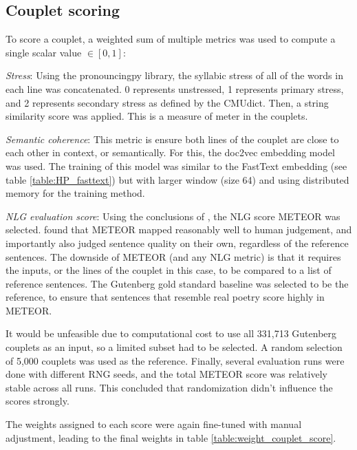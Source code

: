 \documentclass[11pt,a4paper]{article}
\newenvironment{tight_itemize}{
\begin{itemize}
\setlength{\itemsep}{0pt}
\setlength{\parskip}{0pt}
}{\end{itemize}}
\begin{document}
\subsection{Couplet scoring}
\label{sec:coupletscore}
To score a couplet, a weighted sum of multiple metrics was used to compute a single scalar value $\in [0, 1]$:
\begin{tight_itemize}
	\vspace{-0.5em}
	\item \textit{Stress}: Using the pronouncingpy library, the syllabic stress of all of the words in each line was concatenated. 0 represents unstressed, 1 represents primary stress, and 2 represents secondary stress as defined by the CMUdict. Then, a string similarity score \cite{ratcliff} was applied. This is a measure of meter in the couplets.
	\item \textit{Semantic coherence}: This metric is ensure both lines of the couplet are close to each other in context, or semantically. For this, the doc2vec embedding model \cite{docvec} was used. The training of this model was similar to the FastText embedding (see table \ref{table:HP_fasttext}) but with larger window (size 64) and using distributed memory for the training method.
	\item \textit{NLG evaluation score}: Using the conclusions of \citet{nlgeval}, the NLG score METEOR \cite{meteor} was selected. \citet{nlgeval} found that METEOR mapped reasonably well to human judgement, and importantly also judged sentence quality on their own, regardless of the reference sentences. The downside of METEOR (and any NLG metric) is that it requires the inputs, or the lines of the couplet in this case, to be compared to a list of reference sentences. The Gutenberg gold standard baseline was selected to be the reference, to ensure that sentences that resemble real poetry score highly in METEOR.

		It would be unfeasible due to computational cost to use all 331,713 Gutenberg couplets as an input, so a limited subset had to be selected. A random selection of 5,000 couplets was used as the reference. Finally, several evaluation runs were done with different RNG seeds, and the total METEOR score was relatively stable across all runs. This concluded that randomization didn't influence the scores strongly.
\end{tight_itemize}

The weights assigned to each score were again fine-tuned with manual adjustment, leading to the final weights in table \ref{table:weight_couplet_score}.
\end{document}
